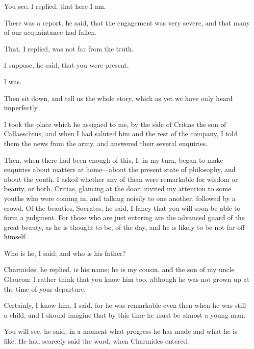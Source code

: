 \documentclass[11pt,letter]{article}
\begin{document}
\par  You see, I replied, that here I am.

\par  There was a report, he said, that the engagement was very severe, and that many of our acquaintance had fallen.

\par  That, I replied, was not far from the truth.

\par  I suppose, he said, that you were present.

\par  I was.

\par  Then sit down, and tell us the whole story, which as yet we have only heard imperfectly.

\par  I took the place which he assigned to me, by the side of Critias the son of Callaeschrus, and when I had saluted him and the rest of the company, I told them the news from the army, and answered their several enquiries.

\par  Then, when there had been enough of this, I, in my turn, began to make enquiries about matters at home—about the present state of philosophy, and about the youth. I asked whether any of them were remarkable for wisdom or beauty, or both. Critias, glancing at the door, invited my attention to some youths who were coming in, and talking noisily to one another, followed by a crowd. Of the beauties, Socrates, he said, I fancy that you will soon be able to form a judgment. For those who are just entering are the advanced guard of the great beauty, as he is thought to be, of the day, and he is likely to be not far off himself.

\par  Who is he, I said; and who is his father?

\par  Charmides, he replied, is his name; he is my cousin, and the son of my uncle Glaucon: I rather think that you know him too, although he was not grown up at the time of your departure.

\par  Certainly, I know him, I said, for he was remarkable even then when he was still a child, and I should imagine that by this time he must be almost a young man.

\par  You will see, he said, in a moment what progress he has made and what he is like. He had scarcely said the word, when Charmides entered.
\end{document}
